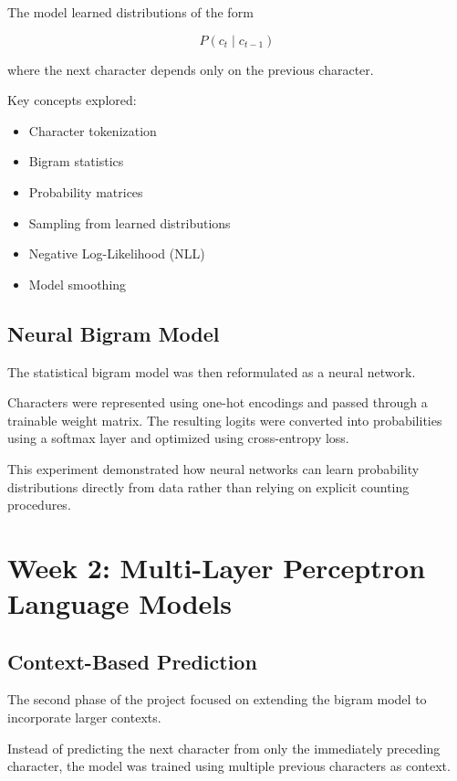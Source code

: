 \documentclass[11pt,a4paper]{article}
\begin{document}
The model learned distributions of the form

\[
P(c_t \mid c_{t-1})
\]

where the next character depends only on the previous character.

Key concepts explored:

\begin{itemize}
    \item Character tokenization
    \item Bigram statistics
    \item Probability matrices
    \item Sampling from learned distributions
    \item Negative Log-Likelihood (NLL)
    \item Model smoothing
\end{itemize}

\subsection{Neural Bigram Model}

The statistical bigram model was then reformulated as a neural network.

Characters were represented using one-hot encodings and passed through a trainable weight matrix. The resulting logits were converted into probabilities using a softmax layer and optimized using cross-entropy loss.

This experiment demonstrated how neural networks can learn probability distributions directly from data rather than relying on explicit counting procedures.

\section{Week 2: Multi-Layer Perceptron Language Models}

\subsection{Context-Based Prediction}

The second phase of the project focused on extending the bigram model to incorporate larger contexts.

Instead of predicting the next character from only the immediately preceding character, the model was trained using multiple previous characters as context.
\end{document}
